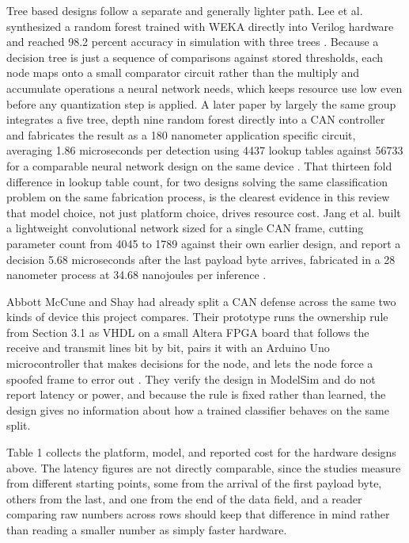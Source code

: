 \documentclass[11pt]{article}
\begin{document}
Tree based designs follow a separate and generally lighter path. Lee et al. synthesized a random forest trained with WEKA directly into Verilog hardware and reached 98.2 percent accuracy in simulation with three trees \cite{lee2023iceic}. Because a decision tree is just a sequence of comparisons against stored thresholds, each node maps onto a small comparator circuit rather than the multiply and accumulate operations a neural network needs, which keeps resource use low even before any quantization step is applied. A later paper by largely the same group integrates a five tree, depth nine random forest directly into a CAN controller and fabricates the result as a 180 nanometer application specific circuit, averaging 1.86 microseconds per detection using 4437 lookup tables against 56733 for a comparable neural network design on the same device \cite{lee2025asic}. That thirteen fold difference in lookup table count, for two designs solving the same classification problem on the same fabrication process, is the clearest evidence in this review that model choice, not just platform choice, drives resource cost. Jang et al. built a lightweight convolutional network sized for a single CAN frame, cutting parameter count from 4045 to 1789 against their own earlier design, and report a decision 5.68 microseconds after the last payload byte arrives, fabricated in a 28 nanometer process at 34.68 nanojoules per inference \cite{jang2026electronics}.

Abbott McCune and Shay had already split a CAN defense across the same two kinds of device this project compares. Their prototype runs the ownership rule from Section 3.1 as VHDL on a small Altera FPGA board that follows the receive and transmit lines bit by bit, pairs it with an Arduino Uno microcontroller that makes decisions for the node, and lets the node force a spoofed frame to error out \cite{abbottmccune2016}. They verify the design in ModelSim and do not report latency or power, and because the rule is fixed rather than learned, the design gives no information about how a trained classifier behaves on the same split.

Table 1 collects the platform, model, and reported cost for the hardware designs above. The latency figures are not directly comparable, since the studies measure from different starting points, some from the arrival of the first payload byte, others from the last, and one from the end of the data field, and a reader comparing raw numbers across rows should keep that difference in mind rather than reading a smaller number as simply faster hardware.
\end{document}
